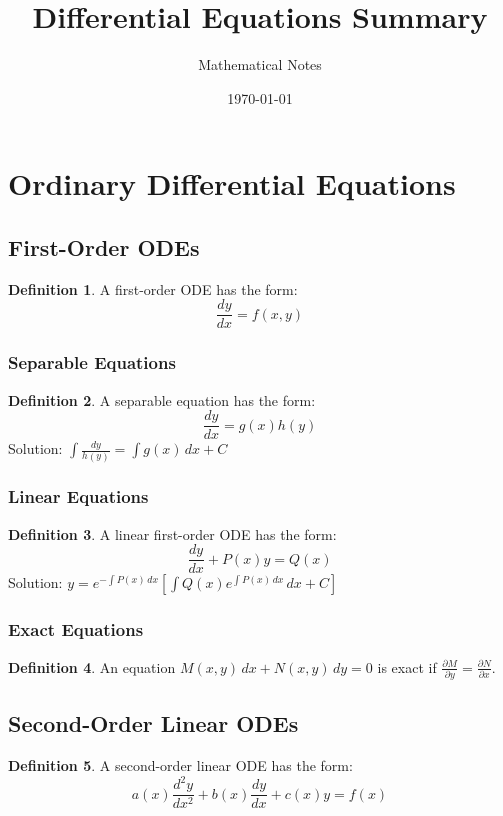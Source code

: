 \documentclass[11pt]{article}
\title{Differential Equations Summary}
\author{Mathematical Notes}
\date{\today}
\theoremstyle{definition}
\newtheorem{definition}{Definition}[section]
\begin{document}
\maketitle

\tableofcontents
\newpage

\section{Ordinary Differential Equations}

\subsection{First-Order ODEs}
\begin{definition}
A first-order ODE has the form:
$$\frac{dy}{dx} = f(x, y)$$
\end{definition}

\subsubsection{Separable Equations}
\begin{definition}
A separable equation has the form:
$$\frac{dy}{dx} = g(x)h(y)$$
Solution: $\int \frac{dy}{h(y)} = \int g(x) \, dx + C$
\end{definition}

\subsubsection{Linear Equations}
\begin{definition}
A linear first-order ODE has the form:
$$\frac{dy}{dx} + P(x)y = Q(x)$$
Solution: $y = e^{-\int P(x) \, dx} \left[\int Q(x) e^{\int P(x) \, dx} \, dx + C\right]$
\end{definition}

\subsubsection{Exact Equations}
\begin{definition}
An equation $M(x,y) \, dx + N(x,y) \, dy = 0$ is exact if $\frac{\partial M}{\partial y} = \frac{\partial N}{\partial x}$.
\end{definition}

\subsection{Second-Order Linear ODEs}
\begin{definition}
A second-order linear ODE has the form:
$$a(x)\frac{d^2y}{dx^2} + b(x)\frac{dy}{dx} + c(x)y = f(x)$$
\end{definition}
\end{document}
